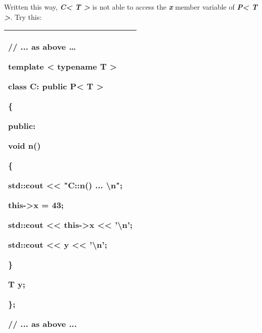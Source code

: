 \documentclass[
]{article}
\begin{document}
Written this way, \emph{\textbf{C\textless{} T \textgreater{}}} is not
able to access the \emph{\textbf{x}} member variable of
\emph{\textbf{P\textless{} T \textgreater{}}}. Try this:

\begin{longtable}[]{@{}l@{}}
\toprule
\endhead
\begin{minipage}[t]{0.97\columnwidth}\raggedright
// ... as above \ldots{}

template \textless{} typename T \textgreater{}

class C: public P\textless{} T \textgreater{}

\{

public:

void n()

\{

std::cout \textless\textless{} "C::n() ... \textbackslash n";

\textbf{this-\textgreater{}}x = 43;

std::cout \textless\textless{} \textbf{this-\textgreater{}}x
\textless\textless{} '\textbackslash n';

std::cout \textless\textless{} y \textless\textless{}
'\textbackslash n';

\}

T y;

\};

// ... as above ...\strut
\end{minipage}\tabularnewline
\bottomrule
\end{longtable}
\end{document}
